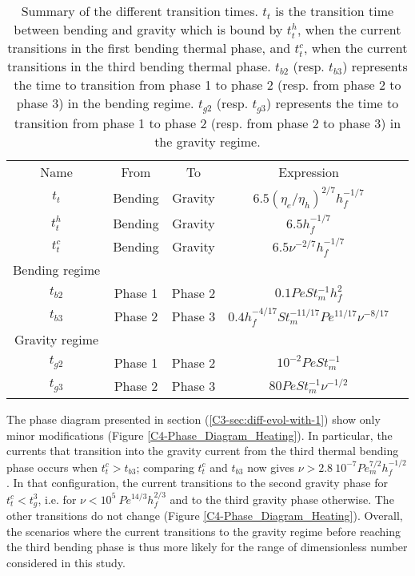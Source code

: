 \begin{table}[htpb]
  \begin{center}
    \begin{tabular}{ccccc}
      Name&From&To&Expression\\
      $t_t$&Bending&Gravity&$6.5(\eta_e/\eta_h)^{2/7}h_f^{-1/7}$\\
      $t_t^h$&Bending&Gravity&$6.5h_f^{-1/7}$\\
      $t_t^c$&Bending&Gravity&$6.5\nu^{-2/7}h_f^{-1/7}$\\
      Bending regime&\multicolumn{3}{c}{} \\
      $t_{b2}$&Phase 1& Phase 2&$0.1 Pe St_m^{-1} h_f^2$\\
      $t_{b3}$&Phase 2& Phase 3 &$0.4 h_f^{-4/17} St_m^{-11/17}Pe^{11/17}\nu^{-8/17}$\\
      Gravity regime&\multicolumn{3}{c}{} \\
      $t_{g2}$ &Phase 1& Phase 2 &$10^{-2}PeSt_m^{-1}$\\
      $t_{g3}$ &Phase 2& Phase 3 &$ 80Pe St_m^{-1}\nu^{-1/2}$\\
    \end{tabular}
    \caption{Summary of the different  transition times.  $t_t$ is the
      transition time  between bending and  gravity which is  bound by
      $t_t^h$,  when  the current  transitions  in  the first  bending
      thermal phase, and $t_t^c$, when  the current transitions in the
      third  bending   thermal  phase.   $t_{b2}$   (resp.   $t_{b3}$)
      represents  the time  to  transition  from phase  1  to phase  2
      (resp. from phase 2 to phase  3) in the bending regime. $t_{g2}$
      (resp. $t_{g3}$) represents the time  to transition from phase 1
      to  phase 2  (resp. from  phase  2 to  phase 3)  in the  gravity
      regime. }
    \label{tab:TimeTransition}
  \end{center}
\end{table}

The phase diagram presented in section (\ref{C3-sec:diff-evol-with-1})
show only minor modifications (Figure \ref{C4-Phase_Diagram_Heating}).
In particular, the  currents that transition into  the gravity current
from  the  third thermal  bending  phase  occurs when  $t_t^c>t_{b3}$;
comparing       $t_t^c$       and       $t_{b3}$       now       gives
$\nu>2.8~10^{-7}Pe_m^{7/2}h_f^{-1/2}$.   In  that  configuration,  the
current  transitions to  the second  gravity phase  for $t_t^c<t_g^3$,
i.e.  for $\nu<10^5~Pe^{14/3}h_f^{2/3}$ and to the third gravity phase
otherwise.    The   other   transitions    do   not   change   (Figure
\ref{C4-Phase_Diagram_Heating}).   Overall,  the scenarios  where  the
current transitions  to the gravity  regime before reaching  the third
bending  phase is  thus more  likely  for the  range of  dimensionless
number considered in this study.

